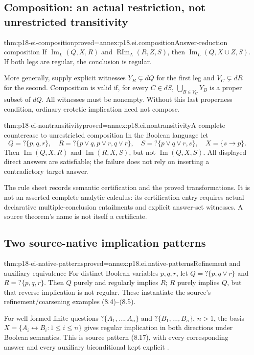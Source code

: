 \subsection{Composition: an actual restriction, not unrestricted transitivity}

\begin{hbtheorem}{thm:p18-ei-composition}{proved=annex:p18.ei.composition}{Answer-reduction composition}
If \(\operatorname{Im}_L(Q,X,R)\) and
\(\operatorname{RIm}_L(R,Z,S)\), then
\(\operatorname{Im}_L(Q,X\cup Z,S)\).
If both legs are regular, the conclusion is regular.

More generally, supply explicit witnesses \(Y_B\subsetneq dQ\) for the
first leg and \(V_C\subsetneq dR\) for the second. Composition is valid
if, for every \(C\in dS\),
\(\bigcup_{B\in V_C}Y_B\) is a proper subset of \(dQ\).
All witnesses must be nonempty. Without this last properness condition,
ordinary erotetic implication need not compose.
\end{hbtheorem}

\begin{hbtheorem}{thm:p18-ei-nontransitivity}{proved=annex:p18.ei.nontransitivity}{A complete countercase to unrestricted composition}
In the Boolean language let
\[
 Q=?\{p,q,r\},\quad
 R=?\{p\lor q,p\lor r,q\lor r\},\quad
 S=?\{p\lor q\lor r,s\},\quad X=\{s\to p\}.
\]
Then \(\operatorname{Im}(Q,X,R)\) and
\(\operatorname{Im}(R,X,S)\), but not
\(\operatorname{Im}(Q,X,S)\). All displayed direct answers are satisfiable;
the failure does not rely on inserting a contradictory target answer.
\end{hbtheorem}

The rule sheet records semantic certification and the proved transformations.
It is not an asserted complete analytic calculus: its certification entry
requires actual declarative multiple-conclusion entailments and explicit
answer-set witnesses. A source theorem's name is not itself a certificate.


\subsection{Two source-native implication patterns}

\begin{hblemma}{thm:p18-ei-native-patterns}{proved=annex:p18.ei.native-patterns}{Refinement and auxiliary equivalence}
For distinct Boolean variables \(p,q,r\), let
\(Q=?\{p,q\lor r\}\) and \(R=?\{p,q,r\}\).
Then \(Q\) purely and regularly implies \(R\); \(R\) purely implies
\(Q\), but that reverse implication is not regular. These instantiate
the source's refinement/coarsening examples (8.4)--(8.5).

For well-formed finite questions \(?\{A_1,\ldots,A_n\}\) and
\(?\{B_1,\ldots,B_n\}\), \(n>1\), the basis
\(X=\{A_i\leftrightarrow B_i:1\leq i\leq n\}\) gives regular
implication in both directions under Boolean semantics. This is source
pattern (8.17), with every corresponding answer and every auxiliary
biconditional kept explicit \cite[pp.~27--28]{Wisniewski2001QuestionsInferences}.
\end{hblemma}

